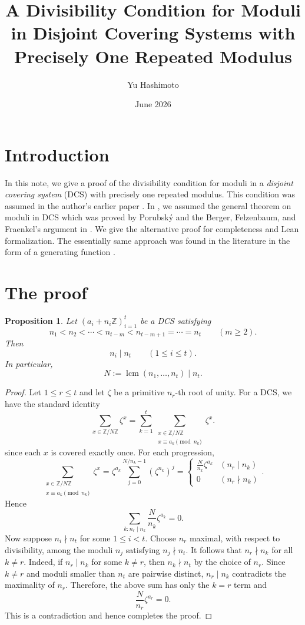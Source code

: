 \documentclass[11pt,reqno]{amsart}
\title{A Divisibility Condition for Moduli in Disjoint Covering Systems with Precisely One Repeated Modulus}
\author{Yu Hashimoto}
\date{June 2026}
\newtheorem{proposition}[theorem]{Proposition}
\theoremstyle{definition}
\newcommand{\Zmod}[1]{\mathbb{Z}/#1\mathbb{Z}}
\begin{document}
\maketitle

\section{Introduction}
In this note, we give a proof of the divisibility condition for moduli in a \emph{disjoint covering system} (DCS) with precisely one repeated modulus. This condition was assumed in the author's earlier paper \cite{Hashimoto}.
In \cite{Hashimoto}, we assumed the general theorem on moduli in DCS which was proved by Porubsk\'y \cite{Porubsky} and the Berger, Felzenbaum, and Fraenkel's argument in \cite{BFF1988}. We give the alternative proof for completeness and Lean formalization. The essentially same approach was found in the literature in the form of a generating function \cite{NovakZnam} \cite{Porubsky}.

\section{The proof}

\begin{proposition}
\label{prop:weak-completion-divisibility}
Let \((a_i+n_i\mathbb{Z})_{i=1}^t\)
be a DCS satisfying 
\begin{equation}\label{eq:distinctas}
n_1 < n_2 < \cdots < n_{t-m} < n_{t-m+1}=\cdots=n_t
\qquad (m\ge 2).
\end{equation}
Then
\[
n_i \mid n_t
\qquad
(1\le i\le t).
\]
In particular,
\[
N:=\operatorname{lcm}(n_1,\dots,n_t) \mid n_t.
\]
\end{proposition}

\begin{proof}
Let $1 \le r \le t$ and let \(\zeta\) be a primitive \(n_r\)-th root of unity.
For a DCS, we have the standard identity
\[
\sum_{x\in\Zmod N}\zeta^x
=
\sum_{k=1}^t
\sum_{\substack{x\in\Zmod N\\x\equiv a_k\pmod{n_k}}}
\zeta^x.
\]
since each $x$ is covered exactly once.
For each progression,
\[
\sum_{\substack{
  x \in \Zmod{N} \\
  x \equiv a_k \pmod{n_k}
}}
\zeta^x
=
\zeta^{a_k} \sum_{j = 0}^{N/n_k - 1}(\zeta^{n_k})^{j}
= 
\begin{cases}
  \frac{N}{n_k}\zeta^{a_k} & (n_r \mid n_k) \\
  0 & (n_r \nmid n_k)
\end{cases}
.
\]
Hence 
\[
\sum_{k \colon n_r \mid n_k} \frac{N}{n_k}\zeta^{a_k}
=
0.
\]
Now suppose $n_i \nmid n_t$ for some $1 \le i < t$. Choose $n_r$ maximal, with respect to divisibility, among
the moduli $n_j$ satisfying $n_j\nmid n_t$.
It follows that $n_r \nmid n_k$ for all $k \neq r$. Indeed, if $n_r \mid n_k$ for some $k \neq r$, then $n_k \nmid n_t$ by the choice of $n_r$. Since $k \neq r$ and moduli smaller than $n_t$ are pairwise distinct, $n_r \mid n_k$ contradicts the maximality of $n_r$. Therefore, the above sum has only the $k = r$ term and 
\[
\frac{N}{n_r}\zeta^{a_r} = 0.
\]
This is a contradiction and hence completes the proof.
\end{proof}



\end{document}

